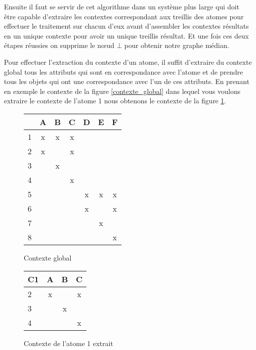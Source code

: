 Ensuite il faut se servir de cet algorithme dans un système plus large qui doit être capable d'extraire les contextes correspondant aux treillis des atomes pour effectuer le traitement sur chacun d'eux avant d'assembler les contextes résultats en un unique contexte pour avoir un unique treillis résultat. Et une fois ces deux étapes réussies on supprime le n\oe ud $\bot$ pour obtenir notre graphe médian.

\bigbreak

Pour effectuer l'extraction du contexte d'un atome, il suffit d'extraire du contexte global tous les attributs qui sont en correspondance avec l'atome et de prendre tous les objets qui ont une correspondance avec l'un de ces attributs. En prenant en exemple le contexte de la figure \ref{contexte_global} dans lequel vous voulons extraire le contexte de l'atome 1 nous obtenons le contexte de la figure \ref{contexte_extrait}.

\begin{figure}[H]
	\begin{minipage}[c]{0.5\textwidth}
	\begin{center}
		\begin{tabular}{ l | c c c c c c }
			 & A & B & C & D & E & F \\
			\hline
			1 & x & x & x & & & \\
			2 & x & & x & & & \\
			3 & & x & & & & \\
			4 & & & x & & & \\
			5 & & & & x & x & x \\
			6 & & & & x & & x \\
			7 & & & & & x & \\
			8 & & & & & & x \\
		\end{tabular}
	\end{center}
	\caption{Contexte global}
	\label{contexte_global}
	\end{minipage}
	\begin{minipage}[c]{0.5\textwidth}
	\begin{center}
		\begin{tabular}{ l | c c c }
			C1 & A & B & C \\
			\hline
			2 & x & & x \\
			3 & & x & \\
			4 & & & x \\
		\end{tabular}
	\end{center}
	\caption{Contexte de l'atome 1 extrait}
	\label{contexte_extrait}
	\end{minipage}
\end{figure}

